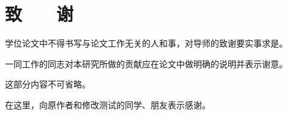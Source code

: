 ﻿%

% 
% 

\chapter*{\hfill 致　　谢 \hfill}

学位论文中不得书写与论文工作无关的人和事，对导师的致谢要实事求是。

一同工作的同志对本研究所做的贡献应在论文中做明确的说明并表示谢意。

这部分内容不可省略。

在这里，向原作者和修改测试的同学、朋友表示感谢。




